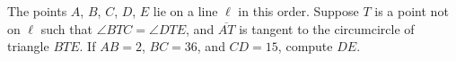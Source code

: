 The points $A$, $B$, $C$, $D$, $E$ lie on a line $\ell$ in this order.  Suppose $T$ is a point not on $\ell$ such that $\angle BTC = \angle DTE$, and $\overline{AT}$ is tangent to the circumcircle of triangle $BTE$.  If $AB = 2$, $BC = 36$, and $CD = 15$, compute $DE$.
